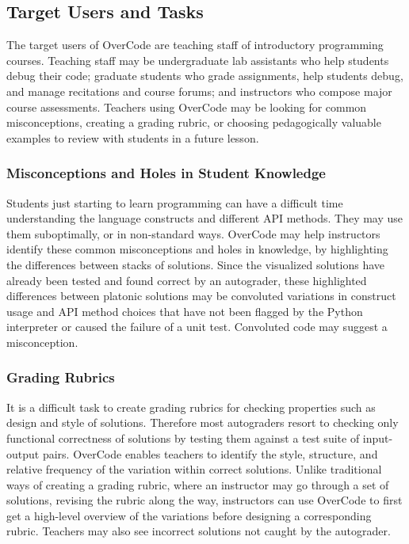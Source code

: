 \subsection{Target Users and Tasks}
The target users of OverCode are teaching staff of introductory programming courses. Teaching staff may be undergraduate lab assistants who help students debug their code; graduate students who grade assignments, help students debug, and manage recitations and course forums; and instructors who compose major course assessments. Teachers using OverCode may be looking for common misconceptions, creating a grading rubric, or choosing pedagogically valuable examples to review with students in a future lesson.

\subsubsection{Misconceptions and Holes in Student Knowledge}
Students just starting to learn programming can have a difficult time understanding the language constructs and different API methods. They may use them suboptimally, or in non-standard ways. OverCode may help instructors identify these common misconceptions and holes in knowledge, by highlighting the differences between stacks of solutions. Since the visualized solutions have already been tested and found correct by an autograder, these highlighted differences between platonic solutions may be convoluted variations in construct usage and API method choices that have not been flagged by the Python interpreter or caused the failure of a unit test. Convoluted code may suggest a misconception.


\subsubsection{Grading Rubrics}
It is a difficult task to create grading rubrics for checking properties such as design and style of solutions. Therefore most autograders resort to checking only functional correctness of solutions by testing them against a test suite of input-output pairs. OverCode enables teachers to identify the style, structure, and relative frequency of the variation within correct solutions. Unlike traditional ways of creating a grading rubric, where an instructor may go through a set of solutions, revising the rubric along the way, instructors can use OverCode to first get a high-level overview of the variations before designing a corresponding rubric. Teachers may also see incorrect solutions not caught by the autograder.

